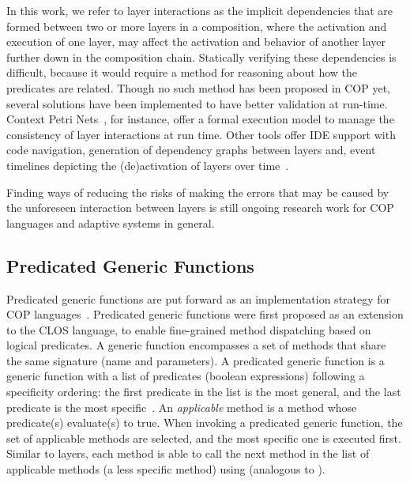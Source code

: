 In this work, we refer to layer interactions as the implicit dependencies that are formed between two or 
more layers in a composition, where the activation and execution of one layer, may affect the activation 
and behavior of another layer further down in the composition chain. Statically verifying these 
dependencies is difficult, because it would require a method for reasoning about how the predicates 
are related. Though no such method has been proposed in \ac{COP} yet, several solutions have been 
implemented to have better validation at run-time. Context Petri Nets~\cite{cardozo12copn}, for 
instance, offer a formal execution model to manage the consistency of layer interactions at run time. 
Other tools offer IDE support with code navigation, generation of dependency graphs between layers 
and, event timelines depicting the (de)activation of layers over time~\cite{duhoux19eics,brand22}.

Finding ways of reducing the risks of making the errors that may be caused by the unforeseen 
interaction between layers is still ongoing research work for \ac{COP} languages and adaptive 
systems in general.


\subsection{Predicated Generic Functions}
\label{sec:pred-gen-functions}

Predicated generic functions are put forward as an implementation strategy for \ac{COP} 
languages~\cite{vallejos10pred}. Predicated generic functions were first proposed as an extension to 
the \ac{CLOS} language, to enable fine-grained method dispatching based on logical predicates.
A generic function encompasses a set of methods that share the same signature (name and 
parameters). A predicated generic function is a generic function with a list of predicates (\ie boolean 
expressions) following a specificity ordering: the first predicate in the list is the most general, and the 
last predicate is the most specific~\cite{vallejos10pred}.
An \emph{applicable} method is a method whose predicate(s) evaluate(s) to true. When invoking a 
predicated generic function, the set of applicable methods are selected, and the most specific one is 
executed first. Similar to layers, each method is able to call the next method in the list of applicable 
methods (\ie a less specific method) using  (analogous to ).

